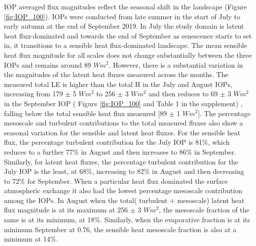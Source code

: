 \documentclass[draft]{agujournal2019}
\begin{document}
IOP averaged flux magnitudes reflect the seasonal shift in the landscape (Figure \ref{fig:IOP_100}). IOPs were conducted from late summer in the start of July to early autumn at the end of September 2019. In July the study domain is latent heat flux-dominated and towards the end of September as senescence starts to set in, it transitions to a sensible heat flux-dominated landscape. The mean sensible heat flux magnitude for all scales does not change substantially between the three IOPs  and remains around 89 $W m^{2}$. However, there is a substantial variation in the magnitudes of the latent heat fluxes measured across the months. The measured total LE is higher than the total H in the July and August IOPs, increasing from 179 $\pm$ 5 $W m^{2}$ to 256 $\pm$ 3 $W m^{2}$ and then reduces to 69 $\pm$ 3 $W m^{2}$ in the September IOP ( Figure \ref{fig:IOP_100} and Table 1 in the supplement) , falling below the total sensible heat flux measured [89 $\pm$ 1 $W m^{2}$]. The percentage mesoscale and turbulent contributions to the total measured fluxes also show a seasonal variation for the sensible and latent heat fluxes. For the sensible heat flux, the percentage turbulent contribution for the July IOP is 81\%, which reduces to a further 77\% in August and then increases to 86\% in September. Similarly, for latent heat fluxes, the percentage turbulent contribution for the July IOP is the least, at 68\%, increasing to 82\% in August and then decreasing to 72\% for September. When a particular heat flux dominated the surface atmospheric exchange it also had the lowest percentage mesoscale contribution among the IOPs. In August when the total( turbulent + mesoscale) latent heat flux magnitude is at its maximum at 256 $\pm$ 3 $W m^{2}$, the mesoscale fraction of the same is at its minimum, at 18\%. Similarly, when the evaporative fraction is at its minimum September at 0.76, the sensible heat mesoscale fraction is also at a minimum at 14\%.
\end{document}
